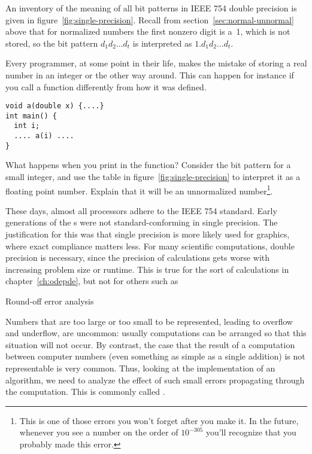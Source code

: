 An inventory of the meaning of all bit patterns in IEEE
754 double precision is given in figure~\ref{fig:single-precision}.
Recall from section~\ref{sec:normal-unnormal} above
that for normalized numbers the first nonzero digit is a~1, which
is not stored, so the bit pattern $d_1d_2\ldots d_t$ is interpreted as
$1.d_1d_2\ldots d_t$.

\begin{exercise}
  Every programmer, at some point in their life, makes the mistake of
  storing a real number in an integer or the other way around. This
  can happen for instance if you call a function differently from how
  it was defined.
\begin{verbatim}
void a(double x) {....}
int main() {
  int i;
  .... a(i) ....
}
\end{verbatim}
What happens when you print  in the function? Consider the bit
pattern for a small integer, and use the table in
figure~\ref{fig:single-precision} to interpret it as a floating point
number. Explain that it will be an unnormalized number\footnote{This
  is one of those errors you won't forget after you make it. In the
  future, whenever you see a number on the order of $10^{-305}$ you'll
  recognize that you probably made this error.}.
\end{exercise}

These days, almost all processors adhere to the IEEE 754 standard.
Early generations of the 
s were not standard-conforming in single precision.
The justification
for this was that single precision is more likely used for graphics,
where exact compliance matters less. For many scientific computations,
double precision is necessary, since the precision of calculations
gets worse with increasing problem size or runtime. This is true for
the sort of calculations in chapter~\ref{ch:odepde}, but not for
others such as 

 {Round-off error analysis}

Numbers that are too large or too small to be represented, leading to
overflow and underflow, are
uncommon: usually computations can be arranged so that this situation
will not occur. By contrast, the case that the result of a computation
between computer numbers
(even something as simple as a single addition) 
is not representable is very common. Thus, looking at the
implementation of an algorithm, we need to analyze the
effect of such small errors propagating through the computation.
This is commonly called
.

